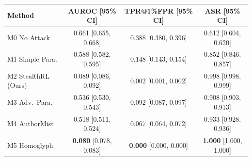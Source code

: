 \begin{tabular}{lccc}
\toprule
Method & AUROC [95\% CI] & TPR@1\%FPR [95\% CI] & ASR [95\% CI] \\
\midrule
M0 No Attack & 0.661 [0.655, 0.668] & 0.388 [0.380, 0.396] & 0.612 [0.604, 0.620] \\
M1 Simple Para. & 0.588 [0.582, 0.595] & 0.148 [0.143, 0.154] & 0.852 [0.846, 0.857] \\
M2 StealthRL (Ours) & 0.089 [0.086, 0.092] & 0.002 [0.001, 0.002] & 0.998 [0.998, 0.999] \\
M3 Adv.\ Para. & 0.536 [0.530, 0.543] & 0.092 [0.087, 0.097] & 0.908 [0.903, 0.913] \\
M4 AuthorMist & 0.518 [0.511, 0.524] & 0.067 [0.064, 0.072] & 0.933 [0.928, 0.936] \\
M5 Homoglyph & \textbf{0.080} [0.078, 0.083] & \textbf{0.000} [0.000, 0.000] & \textbf{1.000} [1.000, 1.000] \\
\bottomrule
\end{tabular}
